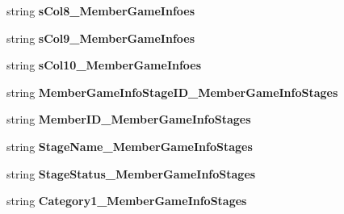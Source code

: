 \begin{DoxyCompactItemize}
\item 
string {\bfseries s\+Col8\+\_\+\+Member\+Game\+Infoes}\hypertarget{a00111_a8ccc04ae0b0421f85338b8e2f6834d7b}{}\label{a00111_a8ccc04ae0b0421f85338b8e2f6834d7b}

\item 
string {\bfseries s\+Col9\+\_\+\+Member\+Game\+Infoes}\hypertarget{a00111_a48d7ff501ea5d9fc29bcda8a15cdb196}{}\label{a00111_a48d7ff501ea5d9fc29bcda8a15cdb196}

\item 
string {\bfseries s\+Col10\+\_\+\+Member\+Game\+Infoes}\hypertarget{a00111_a326bbdbd95b026b6b2e31ac108ec410a}{}\label{a00111_a326bbdbd95b026b6b2e31ac108ec410a}

\item 
string {\bfseries Member\+Game\+Info\+Stage\+I\+D\+\_\+\+Member\+Game\+Info\+Stages}\hypertarget{a00111_a722dcd02f6d046a7fe7edf3eed40e635}{}\label{a00111_a722dcd02f6d046a7fe7edf3eed40e635}

\item 
string {\bfseries Member\+I\+D\+\_\+\+Member\+Game\+Info\+Stages}\hypertarget{a00111_a4436599695cde1b3c5147c3ca62e6e2e}{}\label{a00111_a4436599695cde1b3c5147c3ca62e6e2e}

\item 
string {\bfseries Stage\+Name\+\_\+\+Member\+Game\+Info\+Stages}\hypertarget{a00111_a04e93fbf8bc1c82f99f8e18c1e0f46c3}{}\label{a00111_a04e93fbf8bc1c82f99f8e18c1e0f46c3}

\item 
string {\bfseries Stage\+Status\+\_\+\+Member\+Game\+Info\+Stages}\hypertarget{a00111_a403c1ca6d91fe46b9af8ca6933e5bcea}{}\label{a00111_a403c1ca6d91fe46b9af8ca6933e5bcea}

\item 
string {\bfseries Category1\+\_\+\+Member\+Game\+Info\+Stages}\hypertarget{a00111_addd32c327b8ebcb52a06eec52255dca2}{}\label{a00111_addd32c327b8ebcb52a06eec52255dca2}


\end{DoxyCompactItemize}
